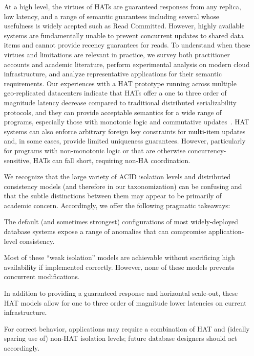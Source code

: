 At a high level, the virtues of HATs are guaranteed responses from any
replica, low latency, and a range of semantic guarantees including
several whose usefulness is widely acepted such as Read
Committed. However, highly available systems are fundamentally unable
to prevent concurrent updates to shared data items and cannot provide
recency guarantees for reads. To understand when these virtues and
limitations are relevant in practice, we survey both practitioner
accounts and academic literature, perform experimental analysis on
modern cloud infrastructure, and analyze representative applications
for their semantic requirements. Our experiences with a HAT prototype
running across multiple geo-replicated datacenters indicate that HATs
offer a one to three order of magnitude latency decrease compared to
traditional distributed serializability protocols, and they can
provide acceptable semantics for a wide range of programs, especially
those with monotonic logic and commutative updates~\cite{calm,
  crdt}. HAT systems can also enforce arbitrary foreign key
constraints for multi-item updates and, in some cases, provide limited
uniqueness guarantees. However, particularly for programs with
non-monotonic logic or that are otherwise concurrency-sensitive, HATs
can fall short, requiring non-HA coordination.

We recognize that the large variety of ACID isolation levels and
distributed consistency models (and therefore in our taxonomization)
can be confusing and that the subtle distinctions between them may
appear to be primarily of academic concern. Accordingly, we offer the
following pragmatic takeaways:
\begin{introenumerate}
\item The default (and sometimes strongest) configurations of most
  widely-deployed database systems expose a range of anomalies that
  can compromise application-level consistency.

\item Most of these ``weak isolation'' models are achievable without
  sacrificing high availability if implemented correctly. However,
  none of these models prevents concurrent modifications.

\item In addition to providing a guaranteed response and horizontal
  scale-out, these HAT models allow for one to three order of
  magnitude lower latencies on current infrastructure.

\item For correct behavior, applications may require a combination of
  HAT and (ideally sparing use of) non-HAT isolation levels; future
  database designers should act accordingly.
\end{introenumerate}

